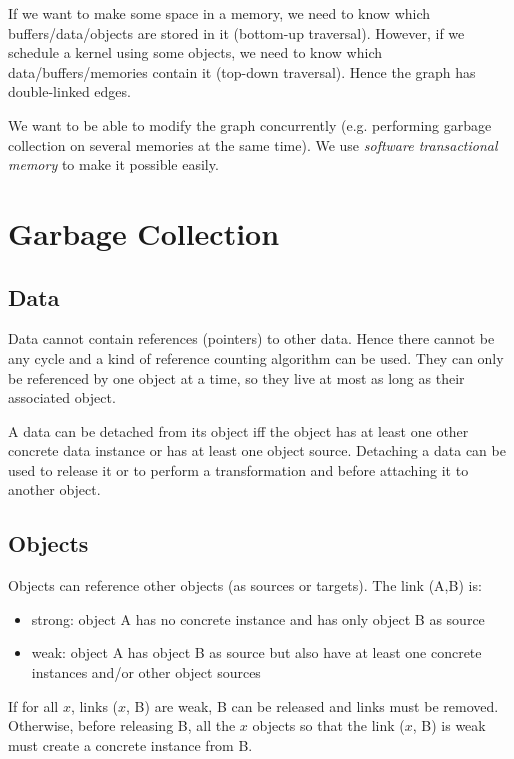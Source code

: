 \documentclass[twocolumn]{article}
\begin{document}
If we want to make some space in a memory, we need to know which
buffers/data/objects are stored in it (bottom-up traversal). However, if we
schedule a kernel using some objects, we need to know which
data/buffers/memories contain it (top-down traversal). Hence the graph has
double-linked edges.

We want to be able to modify the graph concurrently (e.g. performing garbage
collection on several memories at the same time). We use \emph{software
transactional memory} to make it possible easily.

\section{Garbage Collection}

\subsection{Data}

Data cannot contain references (pointers) to other data. Hence there cannot be
any cycle and a kind of reference counting algorithm can be used. They can only
be referenced by one object at a time, so they live at most as long as their
associated object.

A data can be detached from its object iff the object has at least one other
concrete data instance or has at least one object source. Detaching a data can
be used to release it or to perform a transformation and before attaching it to
another object.

\subsection{Objects}

Objects can reference other objects (as sources or targets). The link (A,B) is:
\begin{itemize}
   \item strong: object A has no concrete instance and has only object B as
   source
   \item weak: object A has object B as source but also have at least one concrete
   instances and/or other object sources
\end{itemize}

If for all $x$, links ($x$, B) are weak, B can be released and links must be
removed. Otherwise, before releasing B, all the $x$ objects so that the link
($x$, B) is weak must create a concrete instance from B.
\end{document}
